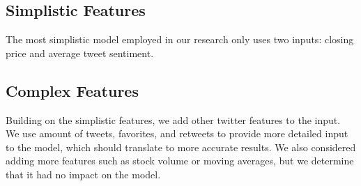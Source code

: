 \documentclass[../thesis.tex]{subfiles}
\begin{document}
\subsection{Simplistic Features}

The most simplistic model employed in our research only uses two inputs: closing price and average tweet sentiment.

\subsection{Complex Features}

Building on the simplistic features, we add other twitter features to the input. We use amount of tweets, favorites, and retweets to provide more detailed input to the model, which should translate to more accurate results. We also considered adding more features such as stock volume or moving averages, but we determine that it had no impact on the model. 
\end{document}
